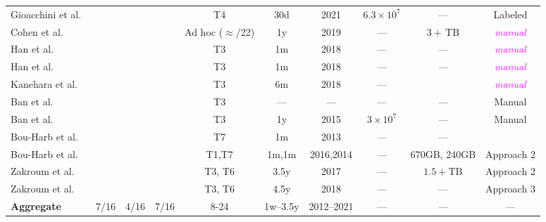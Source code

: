 \documentclass[manuscript,nonacm]{acmart}
\newcommand{\cmark}{\ding{51}}%
\newcommand{\wc}[1]{\textit{\textcolor{magenta}{#1}}} %
\begin{document}
\begin{table}[h!]
\begin{tabular}{@{}lccccccccc@{}}
        Gioacchini et al.~\cite{2021gioacchini,2023gioacchini}
        & \cite{2020cohen}
        & \cmark & \cmark
        & T4
        & 30d & 2021
        & $6.3\times10^{7}$ & ---
        & Labeled \\

        Cohen et al.~\cite{2020cohen}
        & \cite{2016ban}
        &  & \cmark
        & Ad hoc ($\approx$/22)
        & 1y & 2019
        & --- & $3+\,\mathrm{TB}$
        & \wc{manual} \\

        Han et al.~\cite{2021han,2022han}
        & \cite{2020han,2006takeuchi,2019kanehara}
        & \cmark & 
        & T3
        & 1m & 2018
        & --- & ---
        & \wc{manual} \\

        Han et al.~\cite{2020han,2022han}
        & \cite{2006takeuchi}
        & \cmark & \cmark
        & T3
        & 1m & 2018
        & --- & ---
        & \wc{manual} \\

        Kanehara et al.~\cite{2019kanehara,2022han}
        & 
        &  & \cmark
        & T3
        & 6m & 2018
        & --- &
        & \wc{manual} \\

        Ban et al.~\cite{2017ban}
        & \cite{2012ban}
        &  & 
        & T3
        & --- & ---
        & --- & ---
        & Manual \\

        Ban et al.~\cite{2016ban}
        & 
        &  & 
        & T3
        & 1y & 2015
        & $3\times10^{7}$ & ---
        & Manual \\

        Bou-Harb et al.~\cite{2014bouharb}
        &  
        &  & 
        & T7
        & 1m & 2013
        & --- & ---
        &  \\

        Bou-Harb et al.~\cite{2019bouharb,2015bouharb}
        & ~\cite{2018bouharb}
        &  & \cmark
        & T1,T7
        & 1m,1m & 2016,2014
        & --- & 670GB, 240GB
        & Approach 2 \\

        Zakroum et al.~\cite{2022zakroum,2018zakroum}
        & ~\cite{2018zakroum}
        & & \cmark
        & T3, T6
        & 3.5y & 2017
        & --- & $1.5+\mathrm{TB}$
        &  Approach 2 \\

        Zakroum et al.~\cite{2023zakroum}
        & ~\cite{2023zakroum}
        & &
        & T3, T6
        & 4.5y & 2018
        & --- & ---
        & Approach 3 \\

        \midrule
        \textbf{Aggregate}
        & 7/16
        & 4/16 & 7/16
        & 8-24
        & 1w--3.5y & 2012--2021
        & --- & ---
        & --- \\
        \bottomrule
    \end{tabular}
\end{table}
\end{document}
